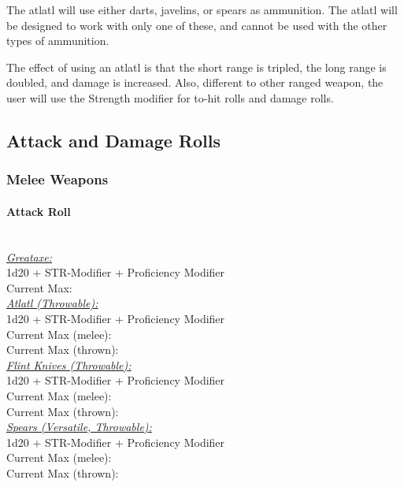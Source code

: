 \documentclass[letterpaper,openany,oneside,twocolumn]{book}
\begin{document}
The atlatl will use either darts, javelins, or spears as ammunition. The atlatl will be designed to work with only one of these, and cannot be used with the other types of ammunition.

The effect of using an atlatl is that the short range is tripled, the long range is doubled, and damage is increased. Also, different to other ranged weapon, the user will use the Strength modifier for to-hit rolls and damage rolls.
\vfill\eject
\subsection*{Attack and Damage Rolls}
\subsubsection*{Melee Weapons}
\paragraph*{Attack Roll}\hfill\\
\underline{\textit{Greataxe:}}\\
1d20 + STR-Modifier + Proficiency Modifier\\
\indent Current Max: 
\\
\underline{\textit{Atlatl (Throwable):}}\\
1d20 + STR-Modifier + Proficiency Modifier\\
\indent Current Max (melee): \\
\indent Current Max (thrown): 
\\
\underline{\textit{Flint Knives (Throwable):}}\\
1d20 + STR-Modifier + Proficiency Modifier\\
\indent Current Max (melee): \\
\indent Current Max (thrown): 
\\
\underline{\textit{Spears (Versatile, Throwable):}}\\
1d20 + STR-Modifier + Proficiency Modifier\\
\indent Current Max (melee): \\
\indent Current Max (thrown): 
\end{document}
